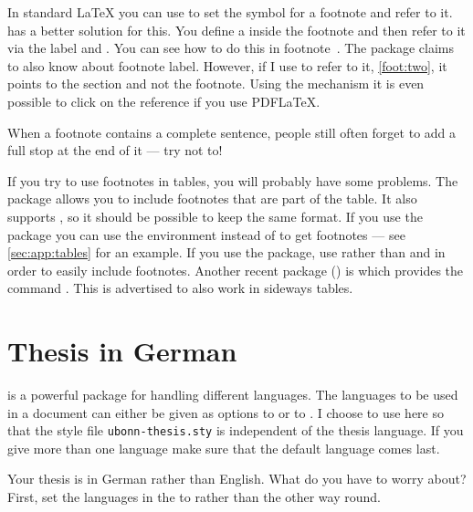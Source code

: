In standard \LaTeX{} you can use 
to set the symbol for a footnote and refer to it.
\KOMAScript{} has a better solution for this.
You define a  inside the footnote and
then refer to it via the label and .
You can see how to do this in footnote~.
The  package claims to also know about footnote label.
However, if I use  to refer to it, \cref{foot:two},
it points to the section and not the footnote.
Using the  mechanism it is even
possible to click on the reference if you use PDF\LaTeX.

When a footnote contains a complete sentence, people still often
forget to add a full stop at the end of it --- try not to!

If you try to use footnotes in tables, you will probably have some
problems. The  package allows you to include footnotes
that are part of the table. It also supports , so it
should be possible to keep the same format. If you use the package
 you can use the environment  
instead of  to get footnotes
--- see \cref{sec:app:tables} for an example. 
If you use the  package, use 
rather than  and  in order to easily include
footnotes.
Another recent package () is
 which provides the command
. This is advertised to also work in sideways tables.


\section{Thesis in German}%
\label{sec:layout:german}

 is a powerful package for handling different
languages. The languages to be used in a document can either be given
as options to  or to . I choose to
use  here so that the style file
\texttt{ubonn-thesis.sty} is independent of the thesis language. If
you give more than one language make sure that the default language
comes last.

Your thesis is in German rather than English. What do you have to
worry about? First, set the languages in the  to
 rather than the other way round.

